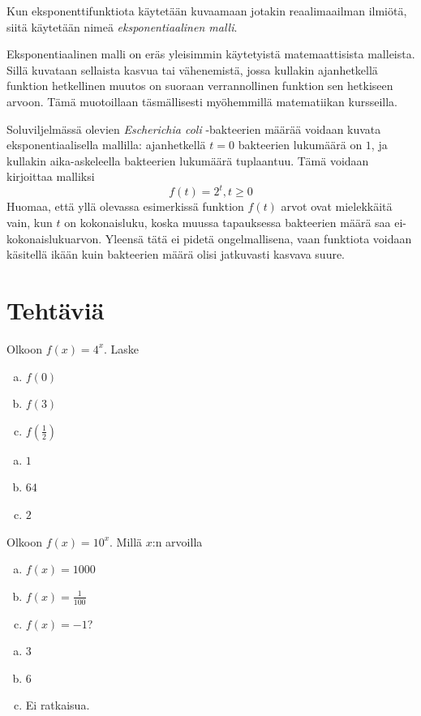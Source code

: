 Kun eksponenttifunktiota käytetään kuvaamaan jotakin reaalimaailman
ilmiötä, siitä käytetään nimeä \emph{eksponentiaalinen malli}.

Eksponentiaalinen malli on eräs yleisimmin käytetyistä matemaattisista
malleista. Sillä kuvataan sellaista kasvua tai vähenemistä, jossa
kullakin ajanhetkellä funktion hetkellinen muutos on suoraan
verrannollinen funktion sen hetkiseen arvoon. Tämä muotoillaan
täsmällisesti myöhemmillä matematiikan kursseilla.

\begin{esimerkki}
Soluviljelmässä olevien \emph{Escherichia coli} -bakteerien
määrää voidaan kuvata eksponentiaalisella mallilla: ajanhetkellä
$t = 0$ bakteerien lukumäärä on $1$, ja kullakin aika-askeleella
bakteerien lukumäärä tuplaantuu. Tämä voidaan
kirjoittaa malliksi
\[
f(t) = 2^t, t \ge 0
\]
Huomaa, että yllä olevassa esimerkissä funktion $f(t)$ arvot ovat
mielekkäitä vain, kun $t$ on kokonaisluku, koska
muussa tapauksessa bakteerien määrä saa ei-kokonaislukuarvon.
Yleensä tätä ei pidetä ongelmallisena, vaan funktiota voidaan käsitellä
ikään kuin bakteerien määrä olisi jatkuvasti kasvava suure.
\end{esimerkki}

\section*{Tehtäviä}

\begin{tehtava}
Olkoon $f(x) = 4^x$. Laske
\begin{enumerate}[a)]
\item $f(0)$
\item $f(3)$
\item $f(\frac{1}{2})$
\end{enumerate}
\begin{vastaus}
\begin{enumerate}[a)]
\item $1$
\item $64$
\item $2$
\end{enumerate}
\end{vastaus}
\end{tehtava}

\begin{tehtava}
Olkoon $f(x) = 10^x$. Millä $x$:n arvoilla
\begin{enumerate}[a)]
\item $f(x) = 1000$
\item $f(x) = \frac{1}{100}$
\item $f(x) = -1$?
\end{enumerate}
\begin{vastaus}
\begin{enumerate}[a)]
\item $3$
\item $6$
\item Ei ratkaisua.
\end{enumerate}
\end{vastaus}
\end{tehtava}

